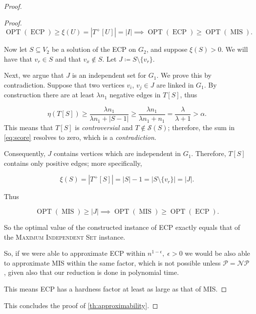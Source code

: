 \begin{proof}
\begin{proof}
		\begin{equation}
			\operatorname{OPT}(\operatorname{ECP}) \geq \xi(U) = |T^{+}[U]| =
			|I| \implies \operatorname{OPT}(\operatorname{ECP}) \geq
			\operatorname{OPT}(\operatorname{MIS}).
		\end{equation}

		Now let $S \subseteq V_2$ be a solution of the \acrshort{ECP} on $G_2$,
		and suppose $\xi(S) > 0$. We will have that $v_{r} \in S$ and that
		$v_{x} \not\in S $. Let $J \coloneqq S \setminus \{v_r\}$.

		Next, we argue that $J$ is an independent set for $G_1$. We prove this by
		contradiction. Suppose that two vertices $v_{i} $, $v_{j} \in J$ are
		linked in $G_1$. By construction there are at least $\lambda n_1$
		negative edges in $T[S]$, thus

		\begin{equation}
			\eta(T[S]) \geq \frac{\lambda n_1}{\lambda n_1 + |S-1|} \geq \frac{\lambda n_1}{\lambda n_1 + n_1} = \frac{\lambda
			}{\lambda + 1} > \alpha.
		\end{equation}
		This means that $T[S]$ is \emph{controversial} and $T \not\in
			\mathcal{S}(S) $; therefore, the sum in \autoref{eq:score} resolves to
		zero, which is a \emph{contradiction}.

		Consequently, $J$ contains vertices which are independent in $G_1$.
		Therefore, $T[S]$ contains only positive edges; more specifically,

		\begin{equation}
			\xi(S) = |T^{+}[S]| = |S| - 1 = |S \setminus \{v_r\}| = |J|.
		\end{equation}

		Thus

		\begin{equation}
			\operatorname{OPT}(\operatorname{MIS}) \geq |J| \implies
			\operatorname{OPT}(\operatorname{MIS}) \geq
			\operatorname{OPT}(\operatorname{ECP}).
		\end{equation}

		So the optimal value of the constructed instance of \acrshort{ECP}
		exactly equals that of the \textsc{Maximum Independent Set} instance.

		So, if we were able to approximate \acrshort{ECP} within
		$n^{1-\epsilon}, \; \epsilon > 0$ we would be also able to approximate MIS within the
		same factor, which is not possible unless $\mathcal{P} = \mathcal{NP}
		$, given also that our reduction is done in polynomial time.

		This means \acrshort{ECP} has a hardness factor at least as large as that of MIS.
	\end{proof}

	This concludes the proof of \autoref{th:approximability}.
\end{proof}

